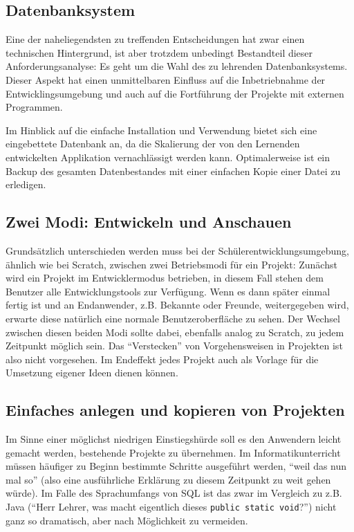 \documentclass[paper=a4,fontsize=11pt,parskip=half]{scrartcl}
\begin{document}
\subsection{Datenbanksystem}

Eine der naheliegendsten zu treffenden Entscheidungen hat zwar einen technischen Hintergrund, ist aber trotzdem unbedingt Bestandteil dieser Anforderungsanalyse: Es geht um die Wahl des zu lehrenden Datenbanksystems. Dieser Aspekt hat einen unmittelbaren Einfluss auf die Inbetriebnahme der Entwicklingsumgebung und auch auf die Fortführung der Projekte mit externen Programmen.

Im Hinblick auf die einfache Installation und Verwendung bietet sich eine eingebettete Datenbank an, da die Skalierung der von den Lernenden entwickelten Applikation vernachlässigt werden kann. Optimalerweise ist ein Backup des gesamten Datenbestandes mit einer einfachen Kopie einer Datei zu erledigen.


\subsection{Zwei Modi: Entwickeln und Anschauen}

Grundsätzlich unterschieden werden muss bei der Schülerentwicklungsumgebung, ähnlich wie bei Scratch, zwischen zwei Betriebsmodi für ein Projekt: Zunächst wird ein Projekt im Entwicklermodus betrieben, in diesem Fall stehen dem Benutzer alle Entwicklungstools zur Verfügung. Wenn es dann später einmal fertig ist und an Endanwender, z.B. Bekannte oder Freunde, weitergegeben wird, erwarte diese natürlich eine normale Benutzeroberfläche zu sehen. Der Wechsel zwischen diesen beiden Modi sollte dabei, ebenfalls analog zu Scratch, zu jedem Zeitpunkt möglich sein. Das ``Verstecken'' von Vorgehensweisen in Projekten ist also nicht vorgesehen. Im Endeffekt jedes Projekt auch als Vorlage für die Umsetzung eigener Ideen dienen können.

\subsection{Einfaches anlegen und kopieren von Projekten}

Im Sinne einer möglichst niedrigen Einstiegshürde soll es den Anwendern leicht gemacht werden, bestehende Projekte zu übernehmen. Im Informatikunterricht müssen häufiger zu Beginn bestimmte Schritte ausgeführt werden, ``weil das nun mal so'' (also eine ausführliche Erklärung zu diesem Zeitpunkt zu weit gehen würde). Im Falle des Sprachumfangs von SQL ist das zwar im Vergleich zu z.B. Java (``Herr Lehrer, was macht eigentlich dieses \texttt{public static void}?'') nicht ganz so dramatisch, aber nach Möglichkeit zu vermeiden.
\end{document}
